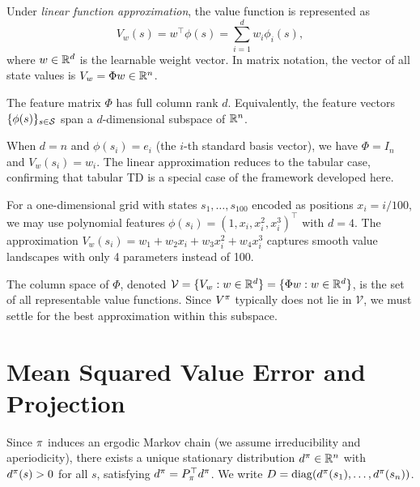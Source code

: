 \documentclass[11pt,a4paper]{article}
\begin{document}
\begin{definition}
\label{def:linear_fa}
Under \emph{linear function approximation}, the value function is
represented as
\begin{equation}
  V_w(s) = w^\top \phi(s) = \sum_{i=1}^d w_i \phi_i(s),
  \label{eq:linear_fa}
\end{equation}
where $w \in \mathbb{R}^d$ is the learnable weight vector. In matrix notation,
the vector of all state values is $V_w = \Phi w \in \mathbb{R}^n$.
\end{definition}

\begin{assumption}
\label{ass:full_rank}
The feature matrix $\Phi$ has full column rank $d$. Equivalently, the
feature vectors $\{\phi(s)\}_{s \in \mathcal{S}}$ span a $d$-dimensional
subspace of $\mathbb{R}^n$.
\end{assumption}

\begin{example}
\label{ex:tabular}
When $d = n$ and $\phi(s_i) = e_i$ (the $i$-th standard basis vector),
we have $\Phi = I_n$ and $V_w(s_i) = w_i$. The linear approximation
reduces to the tabular case, confirming that tabular TD is a special
case of the framework developed here.
\end{example}

\begin{example}
\label{ex:polynomial}
For a one-dimensional grid with states $s_1, \ldots, s_{100}$
encoded as positions $x_i = i/100$, we may use polynomial features
$\phi(s_i) = (1, x_i, x_i^2, x_i^3)^\top$ with $d = 4$. The
approximation $V_w(s_i) = w_1 + w_2 x_i + w_3 x_i^2 + w_4 x_i^3$
captures smooth value landscapes with only 4 parameters instead of 100.
\end{example}

The column space of $\Phi$, denoted $\mathcal{V} = \{V_w : w \in \mathbb{R}^d\}
= \{\Phi w : w \in \mathbb{R}^d\}$, is the set of all representable value
functions. Since $V^\pi$ typically does not lie in $\mathcal{V}$,
we must settle for the best approximation within this subspace.

\section{Mean Squared Value Error and Projection}
\label{sec:msve}

\begin{definition}
\label{def:stationary}
Since $\pi$ induces an ergodic Markov chain (we assume
irreducibility and aperiodicity), there exists a unique stationary
distribution $d^\pi \in \mathbb{R}^n$ with $d^\pi(s) > 0$ for all
$s$, satisfying $d^\pi = P_\pi^\top d^\pi$. We write
$D = \operatorname{diag}(d^\pi(s_1), \ldots, d^\pi(s_n))$.
\end{definition}
\end{document}

